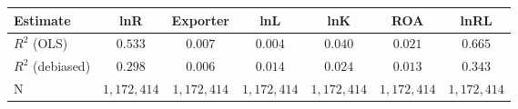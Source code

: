 \begin{tabular}{l*{6}{c}}
\hline\hline
 Estimate & lnR & Exporter & lnL & lnK & ROA & lnRL \\
\hline
\addlinespace $ R^2$ (OLS) & $0.533$ & $0.007$ & $0.004$ & $0.040$ & $0.021$ & $0.665$ \\
$ R^2$ (debiased) & $0.298$ & $0.006$ & $0.014$ & $0.024$ & $0.013$ & $0.343$ \\
N & $1,172,414$ & $1,172,414$ & $1,172,414$ & $1,172,414$ & $1,172,414$ & $1,172,414$ \\
\hline\hline
\end{tabular}
